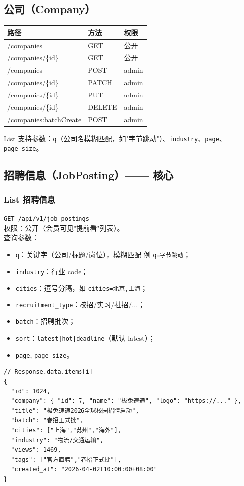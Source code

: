 \documentclass[11pt,a4paper]{ctexart}
\begin{document}
\subsection{公司（Company）}
\begin{tabularx}{\textwidth}{p{4.2cm}p{3cm}X}
\toprule
路径 & 方法 & 权限\\
\midrule
/companies & GET & 公开\\
/companies/\{id\} & GET & 公开\\
/companies & POST & admin\\
/companies/\{id\} & PATCH & admin\\
/companies/\{id\} & PUT & admin\\
/companies/\{id\} & DELETE & admin\\
/companies:batchCreate & POST & admin\\
\bottomrule
\end{tabularx}
List 支持参数：\texttt{q}（公司名模糊匹配，如"字节跳动"）、\texttt{industry}、\texttt{page}、\texttt{page\_size}。

\subsection{招聘信息（JobPosting）—— 核心}
\subsubsection{List 招聘信息}
\texttt{GET /api/v1/job-postings}\\
权限：公开（会员可见"提前看"列表）。\\
查询参数：
\begin{itemize}[leftmargin=2em]
    \item \texttt{q}：关键字（公司/标题/岗位），模糊匹配 例 \texttt{q=字节跳动}；
    \item \texttt{industry}：行业 code；
    \item \texttt{cities}：逗号分隔，如 \texttt{cities=北京,上海}；
    \item \texttt{recruitment\_type}：校招/实习/社招/...；
    \item \texttt{batch}：招聘批次；
    \item \texttt{sort}：\texttt{latest|hot|deadline}（默认 latest）；
    \item \texttt{page}, \texttt{page\_size}。
\end{itemize}
\begin{lstlisting}
// Response.data.items[i]
{
  "id": 1024,
  "company": { "id": 7, "name": "极兔速递", "logo": "https://..." },
  "title": "极兔速递2026全球校园招聘启动",
  "batch": "春招正式批",
  "cities": ["上海","苏州","海外"],
  "industry": "物流/交通运输",
  "views": 1469,
  "tags": ["官方直聘","春招正式批"],
  "created_at": "2026-04-02T10:00:00+08:00"
}
\end{lstlisting}
\end{document}
